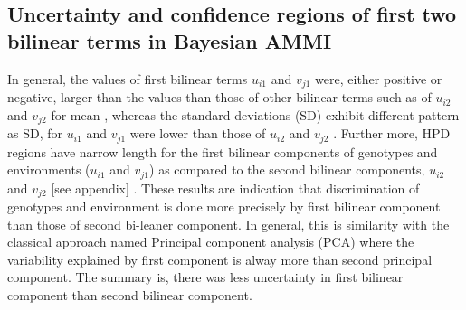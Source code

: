 \subsection{Uncertainty and confidence regions of first two bilinear terms in Bayesian AMMI}
In general, the values of first bilinear terms $u_{i1}$ and $v_{j1}$ were, either positive or negative, larger than the values than those of other bilinear terms such as of $u_{i2}$ and $v_{j2}$ for mean , whereas the standard deviations (SD) exhibit different pattern as SD, for $u_{i1}$ and $v_{j1}$ were lower than those of $u_{i2}$ and $v_{j2}$ . Further more, HPD regions have narrow length for the first bilinear components of genotypes and environments ($u_{i1}$ and $v_{j1}$) as compared to  the second bilinear components, $u_{i2}$ and $v_{j2}$ [see appendix] . These results are indication that discrimination of genotypes and environment is done more precisely by first bilinear component than those of second bi-leaner component. In general, this is similarity with the classical approach named Principal component analysis (PCA) where the variability explained by first component is alway more than second principal component. The summary is, there was less uncertainty in first bilinear component than second bilinear component.

